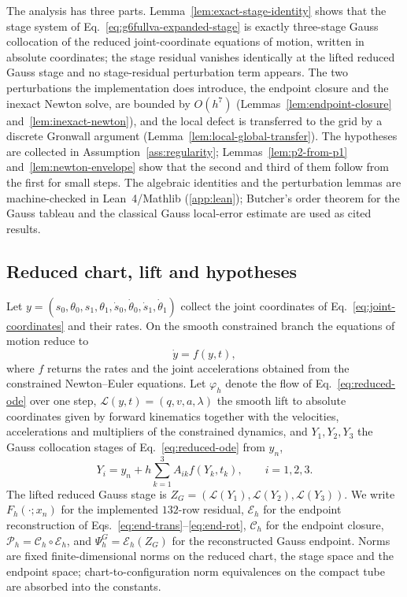\documentclass[preprint,12pt]{elsarticle}
\begin{document}
The analysis has three parts. Lemma~\ref{lem:exact-stage-identity} shows that the stage system of
Eq.~\eqref{eq:g6fullva-expanded-stage} is exactly three-stage Gauss collocation of the reduced
joint-coordinate equations of motion, written in absolute coordinates; the stage residual vanishes
identically at the lifted reduced Gauss stage and no stage-residual perturbation term appears.
The two perturbations the implementation does introduce, the endpoint closure and the inexact
Newton solve, are bounded by $O(h^7)$ (Lemmas~\ref{lem:endpoint-closure}
and~\ref{lem:inexact-newton}), and the local defect is transferred to the grid by a discrete
Gronwall argument (Lemma~\ref{lem:local-global-transfer}). The hypotheses are collected in
Assumption~\ref{ass:regularity}; Lemmas~\ref{lem:p2-from-p1} and~\ref{lem:newton-envelope} show that
the second and third of them follow from the first for small steps. The algebraic identities and the
perturbation lemmas are machine-checked in Lean~4/Mathlib (\ref{app:lean}); Butcher's
order theorem for the Gauss tableau and the classical Gauss local-error estimate
\cite{hairer1993solving} are used as cited results.

\subsection{Reduced chart, lift and hypotheses}

Let $y=(s_0,\theta_0,s_1,\theta_1,\dot s_0,\dot\theta_0,\dot s_1,\dot\theta_1)$ collect the joint
coordinates of Eq.~\eqref{eq:joint-coordinates} and their rates. On the smooth constrained branch
the equations of motion reduce to
\begin{equation}
  \dot y=f(y,t),
  \label{eq:reduced-ode}
\end{equation}
where $f$ returns the rates and the joint accelerations obtained from the constrained Newton--Euler
equations. Let $\varphi_h$ denote the flow of Eq.~\eqref{eq:reduced-ode} over one step,
$\mathcal L(y,t)=(q,v,a,\lambda)$ the smooth lift to absolute coordinates given by forward
kinematics together with the velocities, accelerations and multipliers of the constrained dynamics,
and $Y_1,Y_2,Y_3$ the Gauss collocation stages of Eq.~\eqref{eq:reduced-ode} from $y_n$,
\begin{equation}
  Y_i=y_n+h\sum_{k=1}^3A_{ik}f(Y_k,t_k),\qquad i=1,2,3 .
  \label{eq:reduced-gauss-stages}
\end{equation}
The lifted reduced Gauss stage is $Z_G=(\mathcal L(Y_1),\mathcal L(Y_2),\mathcal L(Y_3))$. We write
$F_h(\cdot;x_n)$ for the implemented $132$-row residual, $\mathcal E_h$ for the endpoint
reconstruction of Eqs.~\eqref{eq:end-trans}--\eqref{eq:end-rot}, $\mathcal C_h$ for the endpoint
closure, $\mathcal P_h=\mathcal C_h\circ\mathcal E_h$, and $\Psi_h^G=\mathcal E_h(Z_G)$ for the
reconstructed Gauss endpoint. Norms are fixed finite-dimensional norms on the reduced chart, the
stage space and the endpoint space; chart-to-configuration norm equivalences on the compact tube are
absorbed into the constants.
\end{document}
